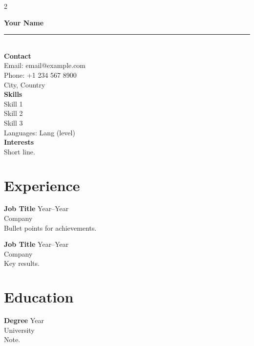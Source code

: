 \documentclass[11pt,a4paper]{article}
\begin{document}
\begin{paracol}{2}

\setlength{\parindent}{0pt}
{\large \textbf{Your Name}}\\[0.2em]
\rule{\linewidth}{2.2cm}\\[0.5em]
\textbf{Contact}\\
Email: email@example.com\\
Phone: +1 234 567 8900\\
City, Country\\[0.6em]
\textbf{Skills}\\
Skill 1\\
Skill 2\\
Skill 3\\
Languages: Lang (level)\\[0.6em]
\textbf{Interests}\\
Short line.

\switchcolumn

\section*{Experience}
\textbf{Job Title} \hfill Year--Year \\
Company \\
Bullet points for achievements.

\textbf{Job Title} \hfill Year--Year \\
Company \\
Key results.

\section*{Education}
\textbf{Degree} \hfill Year \\
University \\
Note.

\end{paracol}
\end{document}
